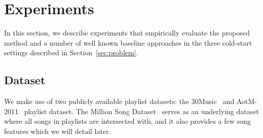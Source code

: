 \section{Experiments}
\label{sec:experiment}

In this section, we describe experiments that empirically evaluate the proposed method and a number of 
well known baseline approaches in the three cold-start settings described in Section~\ref{sec:problem}.


\subsection{Dataset}
We make use of two publicly available playlist datasets: the 30Music~\cite{30music2015} and AotM-2011~\cite{mcfee2012hypergraph} playlist dataset.
The Million Song Dataset~\cite{msd2011} serves as an underlying dataset where all songs in playlists are intersected with,
and it also provides a few song features which we will detail later.


\begin{table}[!b]
\centering
\caption{Music playlist dataset}
\label{tab:stats_pldata}
\end{table}

